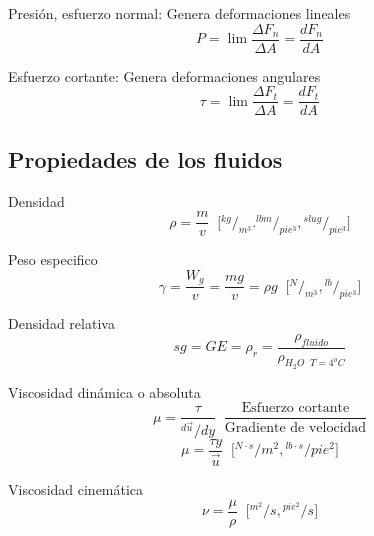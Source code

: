 Presión, esfuerzo normal: Genera deformaciones lineales
\[
    P = \lim \frac{ \Delta F_{n} }{ \Delta A } = \frac{ dF_{n} }{ dA }
\]

Esfuerzo cortante: Genera deformaciones angulares 
\[
    \tau = \lim \frac{ \Delta F_{t} }{ \Delta A } = \frac{ dF_{t} }{ dA }
\]

\subsection{Propiedades de los fluidos}
Densidad 
\[ 
    \rho = \frac{ m }{ v } \;\; \Big[ {}^{ kg }/_{ m^3 }. {}^{ lbm }/_{ pie^3 }, {}^{ slug }/_{ pie^3 } \Big]
\]

Peso especifico
\[
    \gamma = \frac{ W_{g} }{ v } = \frac{ mg }{ v } = \rho g \;\; \Big[ {}^{ N }/_{ m^3 }, {}^{ lb }/_{ pie^3 } \Big]
\]

Densidad relativa 
\[
    sg = GE = \rho_{r} = \frac{ \rho_{fluido} }{ \rho_{H_{2}O \;\; T = 4^{o}C} }
\]

Viscosidad dinámica o absoluta
\[
    \mu = \frac{ \tau }{{}^{ d \Vec{u} }/{ dy }} \;\; \frac{ \text{Esfuerzo cortante} }{ \text{Gradiente de velocidad} }
\]
\[
    \mu = \frac{ \tau y }{ \Vec{u} } \;\; \Big[ {}^{N \cdot s }/{ m^{2}, {}^{ lb \cdot s }/{ pie^2 } } \Big]
\]

Viscosidad cinemática
\[
    \nu = \frac{ \mu }{ \rho } \;\; \Big[ {}^{ m^{2} }/{ s }, {}^{ pie^{2} }/{ s } \Big]
\]